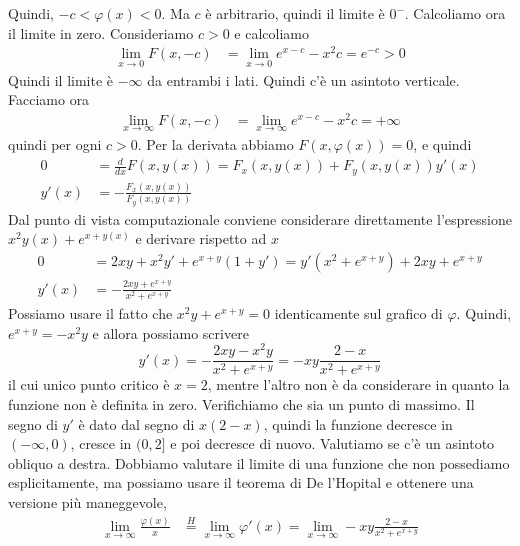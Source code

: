 \documentclass[a4paper]{article}
\begin{document}
\begin{radioactive}
\begin{snippetexample}{}
    Quindi, \(-c < \varphi(x) < 0\).
    Ma \(c\) è arbitrario, quindi il limite è \(0^-\).
    Calcoliamo ora il limite in zero.
    Consideriamo \(c>0\) e calcoliamo
    \begin{align*}
        \lim_{x\to 0} F(x, -c)
        &= \lim_{x\to 0} e^{x-c} -x^2c = e^{-c} > 0
    \end{align*}
    Quindi il limite è \(-\infty\) da entrambi i lati.
    Quindi c'è un asintoto verticale.
    Facciamo ora
        \begin{align*}
        \lim_{x\to \infty} F(x, -c)
        &= \lim_{x\to \infty} e^{x-c} -x^2c = +\infty
    \end{align*}
    quindi per ogni \(c>0\).
    Per la derivata abbiamo \(F(x, \varphi(x))=0\),
    e quindi
    \begin{align*}
        0 &= \frac{d}{dx} F(x,y(x))
        = F_x(x, y(x)) + F_y(x, y(x)) y'(x) \\
        y'(x) &= -\frac{F_x(x, y(x))}{F_y(x, y(x))}
    \end{align*}
    Dal punto di vista computazionale conviene considerare direttamente l'espressione
    \(x^2y(x) + e^{x + y(x)}\) e derivare rispetto ad \(x\)
    \begin{align*}
        0 &= 2xy + x^2y' + e^{x+y}(1 + y')
        = y'(x^2 + e^{x+y}) + 2xy + e^{x+y} \\
        y'(x) &= -\frac{2xy + e^{x+y}}{x^2 + e^{x+y}}
    \end{align*}
    Possiamo usare il fatto che \(x^2y + e^{x+y} = 0\) identicamente sul grafico di \(\varphi\).
    Quindi, \(e^{x+y} = -x^2y\) e  allora possiamo scrivere
    \[
        y'(x) = - \frac{2xy - x^2y}{x^2 + e^{x+y}}
        = - xy \frac{2-x}{x^2 + e^{x+y}}
    \]
    il cui unico punto critico è \(x=2\), mentre l'altro non è
    da considerare in quanto la funzione non è definita in zero.
    Verifichiamo che sia un punto di massimo.
    Il segno di \(y'\) è dato dal segno di \(x(2-x)\),
    quindi la funzione decresce in \((-\infty, 0)\),
    cresce in \((0, 2]\) e poi decresce di nuovo.
    Valutiamo se c'è un asintoto obliquo
    a destra. Dobbiamo valutare il limite di una funzione che non possediamo
    esplicitamente, ma possiamo usare il teorema di De l'Hopital
    e ottenere una versione più maneggevole,
    \begin{align*}
        \lim_{x\to \infty} \frac{\varphi(x)}{x}
        &\overset{H}{=} \lim_{x\to \infty} \varphi'(x)
        = \lim_{x\to \infty} -xy\frac{2-x}{x^2 + e^{x + y}} \\

\end{align*}
\end{snippetexample}
\end{radioactive}
\end{document}
